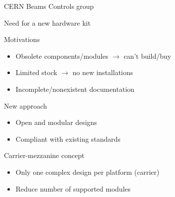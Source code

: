 \documentclass[compress,red]{beamer}
\begin{document}
\begin{frame}{CERN Beams Controls group}


\end{frame}

\begin{frame}{Need for a new hardware kit}

  \begin{block}{Motivations}
    \begin{itemize}
    \item Obsolete components/modules $\rightarrow$ can't build/buy
    \item Limited stock $\rightarrow$ no new installations
    \item Incomplete/nonexistent documentation
    \end{itemize}
  \end{block}

  \begin{block}{New approach}
    \begin{itemize}
    \item Open and modular designs
    \item Compliant with existing standards
    \end{itemize}
  \end{block}

  \begin{block}{Carrier-mezzanine concept}
    \begin{itemize}
    \item Only one complex design per platform (carrier)
    \item Reduce number of supported modules
    \end{itemize}
  \end{block}

\end{frame}
\end{document}
